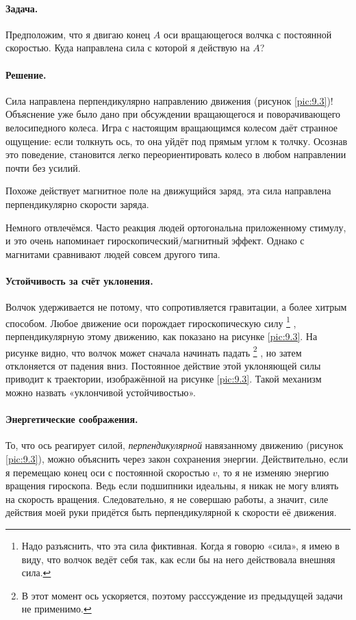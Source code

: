 \paragraph{Задача.}\label{Антигравитационное велоколесо:Задача}
Предположим, что я двигаю конец $A$ оси вращающегося волчка с постоянной скоростью.
Куда направлена сила с которой я действую на $A$?

\paragraph{Решение.}
Сила направлена перпендикулярно направлению движения (рисунок \ref{pic:9.3})!
Объяснение уже было дано при обсуждении вращающегося и поворачивающего велосипедного колеса.
Игра с настоящим вращающимся колесом даёт странное ощущение: если толкнуть ось, то она уйдёт под прямым углом к толчку.
Осознав это поведение, становится легко переориентировать колесо в любом направлении почти без усилий.

Похоже действует магнитное поле на движущийся заряд, эта сила направлена перпендикулярно скорости заряда.

Немного отвлечёмся.
Часто реакция людей ортогональна приложенному стимулу,
и это очень напоминает гироскопический/магнитный эффект.
Однако с магнитами сравнивают людей совсем другого типа.

\paragraph{Устойчивость за счёт уклонения.}
Волчок удерживается не потому, что сопротивляется гравитации, а более хитрым способом.
Любое движение оси порождает гироскопическую силу%
\footnote{Надо разъяснить, что эта сила фиктивная.
Когда я говорю «сила», я имею в виду, что волчок ведёт себя так, как если бы на него действовала внешняя сила.}%
, перпендикулярную этому движению, как показано на рисунке \ref{pic:9.3}.
На рисунке видно, что волчок может сначала начинать падать%
\footnote{В этот момент ось ускоряется, поэтому расссуждение из предыдущей задачи не применимо.\pr}%
, но затем отклоняется от падения вниз.
Постоянное действие этой уклоняющей силы приводит к траектории, изображённой на рисунке \ref{pic:9.3}.
Такой механизм можно назвать «уклончивой устойчивостью».

\paragraph{Энергетические соображения.}
То, что ось реагирует силой, \emph{перпендикулярной} навязанному движению (рисунок \ref{pic:9.3}), можно объяснить через закон сохранения энергии.
Действительно, если я перемещаю конец оси с постоянной скоростью $v$, то я не изменяю энергию вращения гироскопа.
Ведь если подшипники идеальны, я никак не могу влиять на скорость вращения.
Следовательно, я не совершаю работы, а значит, силе действия моей руки придётся быть перпендикулярной к скорости её движения.

